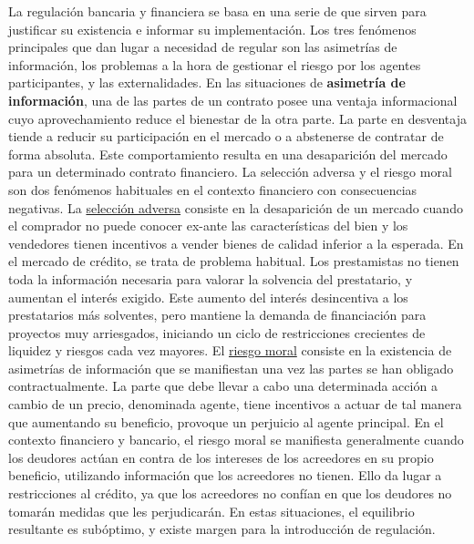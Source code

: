 \documentclass{nuevotema}
\begin{document}
La regulación bancaria y financiera se basa en una serie de  que sirven para justificar su existencia e informar su implementación. Los tres fenómenos principales que dan lugar a necesidad de regular son las asimetrías de información, los problemas a la hora de gestionar el riesgo por los agentes participantes, y las externalidades. En las situaciones de \textbf{asimetría de información}, una de las partes de un contrato posee una ventaja informacional cuyo aprovechamiento reduce el bienestar de la otra parte. La parte en desventaja tiende a reducir su participación en el mercado o a abstenerse de contratar de forma absoluta. Este comportamiento resulta en una desaparición del mercado para un determinado contrato financiero. La selección adversa y el riesgo moral son dos fenómenos habituales en el contexto financiero con consecuencias negativas. La \underline{selección adversa} consiste en la desaparición de un mercado cuando el comprador no puede conocer ex-ante las características del bien y los vendedores tienen incentivos a vender bienes de calidad inferior a la esperada. En el mercado de crédito, se trata de problema habitual. Los prestamistas no tienen toda la información necesaria para valorar la solvencia del prestatario, y aumentan el interés exigido. Este aumento del interés desincentiva a los prestatarios más solventes, pero mantiene la demanda de financiación para proyectos muy arriesgados, iniciando un ciclo de restricciones crecientes de liquidez y riesgos cada vez mayores. El \underline{riesgo moral} consiste en la existencia de asimetrías de información que se manifiestan una vez las partes se han obligado contractualmente. La parte que debe llevar a cabo una determinada acción a cambio de un precio, denominada agente, tiene incentivos a actuar de tal manera que aumentando su beneficio, provoque un perjuicio al agente principal. En el contexto financiero y bancario, el riesgo moral se manifiesta generalmente cuando los deudores actúan en contra de los intereses de los acreedores en su propio beneficio, utilizando información que los acreedores no tienen. Ello da lugar a restricciones al crédito, ya que los acreedores no confían en que los deudores no tomarán medidas que les perjudicarán. En estas situaciones, el equilibrio resultante es subóptimo, y existe margen para la introducción de regulación.
\end{document}
